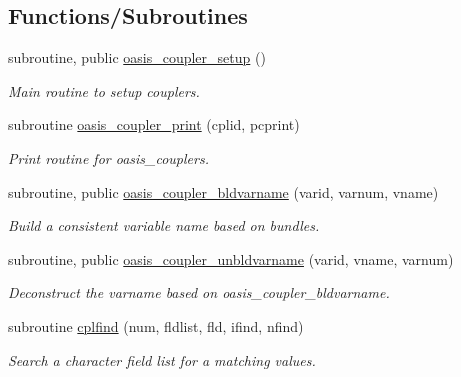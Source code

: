 \subsection*{Functions/\+Subroutines}
\begin{DoxyCompactItemize}
\item 
subroutine, public \hyperlink{namespacemod__oasis__coupler_ab48c4d4ee118f948ccc286eec5b509ec}{oasis\+\_\+coupler\+\_\+setup} ()
\begin{DoxyCompactList}\small\item\em Main routine to setup couplers. \end{DoxyCompactList}\item 
subroutine \hyperlink{namespacemod__oasis__coupler_a5cb96db0ae7b837db934689a49df3da6}{oasis\+\_\+coupler\+\_\+print} (cplid, pcprint)
\begin{DoxyCompactList}\small\item\em Print routine for oasis\+\_\+couplers. \end{DoxyCompactList}\item 
subroutine, public \hyperlink{namespacemod__oasis__coupler_a65adf0558cfd9a9d316bd22ad1f9dc23}{oasis\+\_\+coupler\+\_\+bldvarname} (varid, varnum, vname)
\begin{DoxyCompactList}\small\item\em Build a consistent variable name based on bundles. \end{DoxyCompactList}\item 
subroutine, public \hyperlink{namespacemod__oasis__coupler_ad8c9a74a349ea4420ac38e2da2dc3cd2}{oasis\+\_\+coupler\+\_\+unbldvarname} (varid, vname, varnum)
\begin{DoxyCompactList}\small\item\em Deconstruct the varname based on oasis\+\_\+coupler\+\_\+bldvarname. \end{DoxyCompactList}\item 
subroutine \hyperlink{namespacemod__oasis__coupler_a773e323d2275aff227e05e98ce97def1}{cplfind} (num, fldlist, fld, ifind, nfind)
\begin{DoxyCompactList}\small\item\em Search a character field list for a matching values. \end{DoxyCompactList}\end{DoxyCompactItemize}
